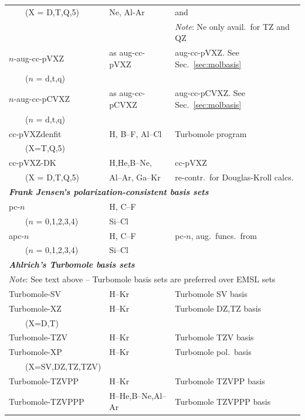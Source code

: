 \begin{longtable}{lll}
 ~~~~(X = D,T,Q,5) & Ne, Al-Ar &  and \cite{dewthdjcp103,kapthdjcp117}\\
                   & & \emph{Note}: Ne only avail.\ for TZ and QZ \\
$n$-aug-cc-pVXZ & as aug-cc-pVXZ & aug-cc-pVXZ. See Sec.~\ref{sec:molbasis} \\
 ~~~~($n$ = d,t,q) & & \\
$n$-aug-cc-pCVXZ & as aug-cc-pCVXZ & aug-cc-pCVXZ. See Sec.~\ref{sec:molbasis} \\
 ~~~~($n$ = d,t,q) & & \\
cc-pVXZdenfit & H, B--F, Al--Cl & Turbomole program \\
 ~~~~(X=T,Q,5) & & \\
cc-pVXZ-DK & H,He,B--Ne, & \cite{thdjcp90,dewthdjcp100,dewthdjcp98,akwdewkapthdjcp110} 
  cc-pVXZ \\
 ~~~~(X = D,T,Q,5) & Al--Ar, Ga--Kr & re-contr.\ for Douglas-Kroll calcs.\\
\hline
\multicolumn{3}{l}{\bf{\emph{Frank Jensen's polarization-consistent basis 
sets\index{basis set!polarization-consistent}\index{polarization-consistent basis set}}}} \\
pc-$n$ & H, C--F & \cite{fjjcp115,fjjcp116} \\
 ~~~~($n$ = 0,1,2,3,4) & Si--Cl & \cite{fjthjcp121} \\
apc-$n$ & H, C--F & pc-$n$, aug.\ funcs.\ from \cite{fjjcp117} \\
 ~~~~($n$ = 0,1,2,3,4) & Si--Cl & \cite{fjthjcp121} \\
\hline
\multicolumn{3}{l}{\bf{\emph{Ahlrich's Turbomole basis sets}}} \\
\multicolumn{3}{l}{\emph{Note}: See text above -- Turbomole basis sets are preferred over EMSL sets} \\
Turbomole-SV & H--Kr & \cite{ashhrajcp97} Turbomole SV basis\\
Turbomole-XZ & H--Kr & \cite{ashhrajcp97} Turbomole DZ,TZ basis\\
 ~~~~(X=D,T) & & \\
Turbomole-TZV & H--Kr & \cite{aschrajcp100} Turbomole TZV basis \\
Turbomole-XP & H--Kr & \cite{ashhrajcp97,aschrajcp100} Turbomole pol.\ basis \\
 ~~~~(X=SV,DZ,TZ,TZV) & & \\
Turbomole-TZVPP & H--Kr & \cite{aschrajcp100} Turbomole TZVPP basis \\
Turbomole-TZVPPP & H--He,B--Ne,Al--Ar & \cite{aschrajcp100} Turbomole TZVPPP basis \\

\end{longtable}
